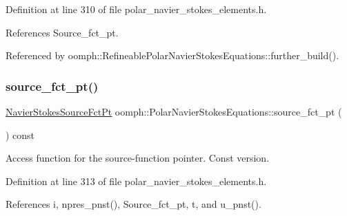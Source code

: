 Definition at line 310 of file polar\+\_\+navier\+\_\+stokes\+\_\+elements.\+h.



References Source\+\_\+fct\+\_\+pt.



Referenced by oomph\+::\+Refineable\+Polar\+Navier\+Stokes\+Equations\+::further\+\_\+build().

\mbox{\label{classoomph_1_1PolarNavierStokesEquations_ae96ba2b2234252b7f7b1d2de1420db97}} 
\subsubsection{\texorpdfstring{source\+\_\+fct\+\_\+pt()}{source\_fct\_pt()}\hspace{0.1cm}{\footnotesize\ttfamily [2/2]}}
{\footnotesize\ttfamily \hyperlink{classoomph_1_1PolarNavierStokesEquations_a9084ecf962b26ccaa72443a807dedb25}{Navier\+Stokes\+Source\+Fct\+Pt} oomph\+::\+Polar\+Navier\+Stokes\+Equations\+::source\+\_\+fct\+\_\+pt (\begin{DoxyParamCaption}{ }\end{DoxyParamCaption}) const\hspace{0.3cm}{\ttfamily [inline]}}



Access function for the source-\/function pointer. Const version. 



Definition at line 313 of file polar\+\_\+navier\+\_\+stokes\+\_\+elements.\+h.



References i, npres\+\_\+pnst(), Source\+\_\+fct\+\_\+pt, t, and u\+\_\+pnst().

\mbox{\label{classoomph_1_1PolarNavierStokesEquations_a5d46a1417439c7abd56219f8a538a63a}} 
